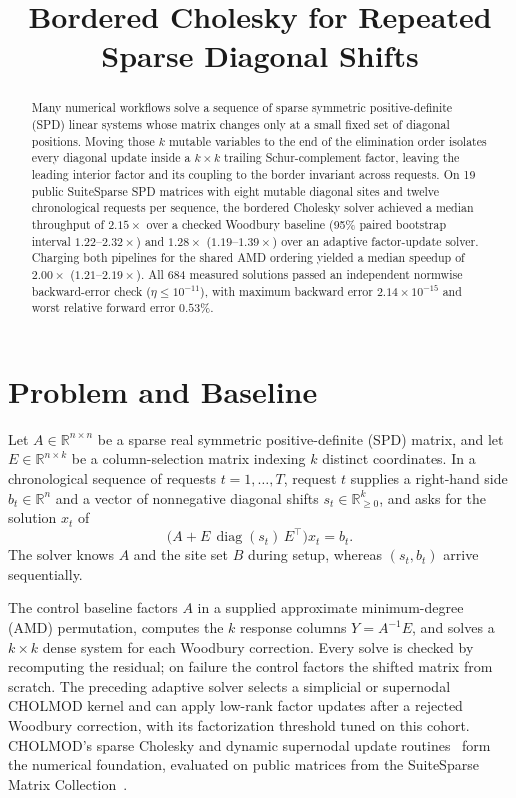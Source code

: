 \documentclass[10pt,letterpaper]{article}
\title{Bordered Cholesky for Repeated Sparse Diagonal Shifts}
\author{}
\date{}
\begin{document}
\maketitle
\vspace{-2.5em}

\begin{abstract}
Many numerical workflows solve a sequence of sparse symmetric positive-definite (SPD) linear systems whose matrix changes only at a small fixed set of diagonal positions. Moving those $k$ mutable variables to the end of the elimination order isolates every diagonal update inside a $k \times k$ trailing Schur-complement factor, leaving the leading interior factor and its coupling to the border invariant across requests. On 19 public SuiteSparse SPD matrices with eight mutable diagonal sites and twelve chronological requests per sequence, the bordered Cholesky solver achieved a median throughput of $2.15\times$ over a checked Woodbury baseline (95\% paired bootstrap interval $1.22\text{--}2.32\times$) and $1.28\times$ ($1.19\text{--}1.39\times$) over an adaptive factor-update solver. Charging both pipelines for the shared AMD ordering yielded a median speedup of $2.00\times$ ($1.21\text{--}2.19\times$). All 684 measured solutions passed an independent normwise backward-error check ($\eta \leq 10^{-11}$), with maximum backward error $2.14 \times 10^{-15}$ and worst relative forward error $0.53\%$.
\end{abstract}

\section{Problem and Baseline}

Let $A \in \mathbb{R}^{n \times n}$ be a sparse real symmetric positive-definite (SPD) matrix, and let $E \in \mathbb{R}^{n \times k}$ be a column-selection matrix indexing $k$ distinct coordinates. In a chronological sequence of requests $t = 1, \dots, T$, request $t$ supplies a right-hand side $b_t \in \mathbb{R}^n$ and a vector of nonnegative diagonal shifts $s_t \in \mathbb{R}_{\ge 0}^k$, and asks for the solution $x_t$ of
\[
\bigl(A + E\,\operatorname{diag}(s_t)\,E^\top\bigr)x_t = b_t.
\]
The solver knows $A$ and the site set $B$ during setup, whereas $(s_t, b_t)$ arrive sequentially.

The control baseline factors $A$ in a supplied approximate minimum-degree (AMD) permutation, computes the $k$ response columns $Y = A^{-1}E$, and solves a $k \times k$ dense system for each Woodbury correction. Every solve is checked by recomputing the residual; on failure the control factors the shifted matrix from scratch. The preceding adaptive solver selects a simplicial or supernodal CHOLMOD kernel and can apply low-rank factor updates after a rejected Woodbury correction, with its factorization threshold tuned on this cohort. CHOLMOD's sparse Cholesky and dynamic supernodal update routines~\cite{chen2008,davis2009} form the numerical foundation, evaluated on public matrices from the SuiteSparse Matrix Collection~\cite{davis2011}.
\end{document}
